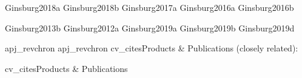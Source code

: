 \documentclass[12pt]{article}
\begin{document}
%

\nocite{biba}{Ginsburg2018a}
\nocite{biba}{Ginsburg2018b}
\nocite{biba}{Ginsburg2017a}
\nocite{biba}{Ginsburg2016a}
\nocite{biba}{Ginsburg2016b}

\nocite{bibb}{Ginsburg2013b}
\nocite{bibb}{Ginsburg2012a}
\nocite{bibb}{Ginsburg2019a}
\nocite{bibb}{Ginsburg2019b}
\nocite{bibb}{Ginsburg2019d}

{apj_revchron}
{apj_revchron}
%
%
{cv_cites}{Products \& Publications (closely related):}
%


{cv_cites}{Products \& Publications}

\vfill  
\nopagebreak



%


% 
% 
% 
% 
% 
% 
% 
% 
% 
% 
% 
% 
% 
% 
% 
\end{document}
